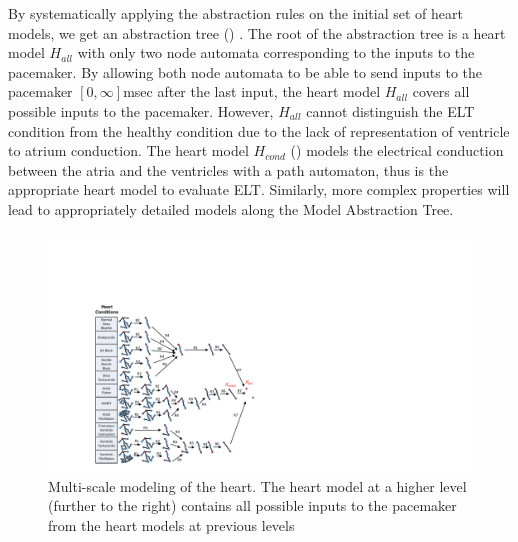 By systematically applying the abstraction rules on the initial set of heart models, we get an abstraction tree  () .
The root of the abstraction tree is a heart model $H_{all}$ with only two node automata corresponding to the inputs to the pacemaker.
By allowing both node automata to be able to send inputs to the pacemaker $[0,\infty]$msec after the last input, the heart model $H_{all}$ covers all possible inputs to the pacemaker. However, $H_{all}$ cannot distinguish the ELT condition from the healthy condition due to the lack of representation of ventricle to atrium conduction. 
The heart model $H_{cond}$ () models the electrical conduction between the atria and the ventricles with a path automaton, thus is the appropriate heart model to evaluate ELT. 
Similarly, more complex properties will lead to appropriately detailed models along the Model Abstraction Tree.%

\begin{figure}[t]
	\centering
	\includegraphics[width=\textwidth]{figs/abs_tree.pdf}
	\caption{\small Multi-scale modeling of the heart. The heart model at a higher level (further to the right) contains all possible inputs to the pacemaker from the heart models at previous levels}
	\label{fig:abs_tree}
\end{figure}
